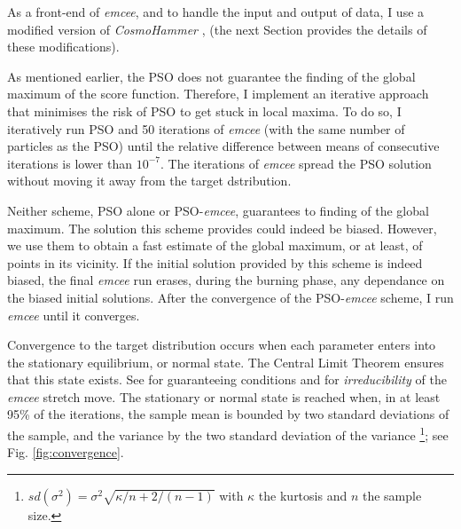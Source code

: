 As a front-end of \emph{emcee}, and to handle the input and output of data, I use a modified version of \emph{CosmoHammer} \citep{Akeret2013}, (the next Section provides the details of these modifications). 

As mentioned earlier, the PSO does not guarantee the finding of the global maximum of the score function. Therefore, I implement an iterative approach that minimises the risk of PSO to get stuck in local maxima. To do so, I iteratively run PSO and 50 iterations of \emph{emcee} (with the same number of particles as the PSO) until the relative difference between means of consecutive iterations is lower than $10^{-7}$. The iterations of \emph{emcee} spread the PSO solution without moving it away from the target dstribution. 
 
Neither scheme, PSO alone or PSO-\emph{emcee}, guarantees to finding of the global maximum. The solution this scheme provides could indeed be biased. However, we use them to obtain a fast estimate of the global maximum, or at least, of points in its vicinity. If the initial solution provided by this scheme is indeed biased, the final \emph{emcee} run erases, during the burning phase, any dependance on the biased initial solutions. After the convergence of the PSO-\emph{emcee} scheme, I run \emph{emcee} until it converges.  
 
Convergence to the target distribution occurs when each parameter enters into the stationary equilibrium, or normal state. The Central Limit Theorem ensures that this state exists. See \citet{Roberts2004} for guaranteeing conditions and \citet{Goodman2010} for \emph{irreducibility} of the \emph{emcee} stretch move. The stationary or normal state is reached when, in at least 95\% of the iterations, the sample mean is bounded by two standard deviations of the sample, and the variance by the two standard deviation of the variance \footnote{
$sd(\sigma^2)=\sigma^2 \sqrt{\kappa/n + 2/(n-1)}$ with $\kappa$ the kurtosis and $n$ the sample size.
}; see Fig. \ref{fig:convergence}.


